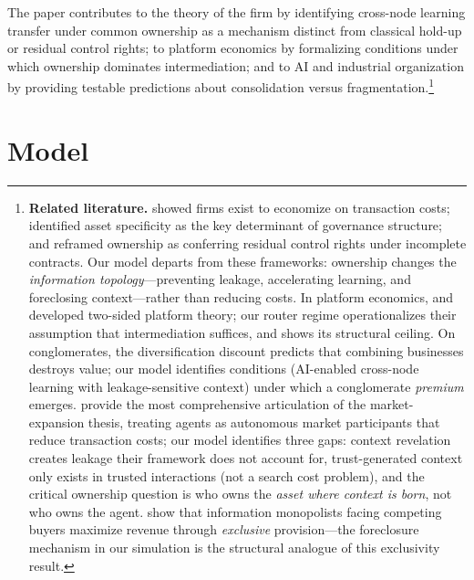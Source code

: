 \documentclass[12pt]{article}
\theoremstyle{definition}
\begin{document}
The paper contributes to the theory of the firm \citep{coase1937, williamson1975, grossman1986, hart1990} by identifying cross-node learning transfer under common ownership as a mechanism distinct from classical hold-up or residual control rights; to platform economics \citep{rochet2003, parker2016} by formalizing conditions under which ownership dominates intermediation; and to AI and industrial organization \citep{agrawal2018, brynjolfsson2017} by providing testable predictions about consolidation versus fragmentation.\footnote{\textbf{Related literature.} \citet{coase1937} showed firms exist to economize on transaction costs; \citet{williamson1975, williamson1985} identified asset specificity as the key determinant of governance structure; \citet{grossman1986} and \citet{hart1990} reframed ownership as conferring residual control rights under incomplete contracts. Our model departs from these frameworks: ownership changes the \textit{information topology}---preventing leakage, accelerating learning, and foreclosing context---rather than reducing costs. In platform economics, \citet{rochet2003} and \citet{armstrong2006} developed two-sided platform theory; our router regime operationalizes their assumption that intermediation suffices, and shows its structural ceiling. On conglomerates, the diversification discount \citep{berger1995, lang1994, jensen1986} predicts that combining businesses destroys value; our model identifies conditions (AI-enabled cross-node learning with leakage-sensitive context) under which a conglomerate \textit{premium} emerges. \citet{shahidi2025} provide the most comprehensive articulation of the market-expansion thesis, treating agents as autonomous market participants that reduce transaction costs; our model identifies three gaps: context revelation creates leakage their framework does not account for, trust-generated context only exists in trusted interactions (not a search cost problem), and the critical ownership question is who owns the \textit{asset where context is born}, not who owns the agent. \citet{bonatti2022} show that information monopolists facing competing buyers maximize revenue through \textit{exclusive} provision---the foreclosure mechanism in our simulation is the structural analogue of this exclusivity result.}

\section{Model}
\end{document}
